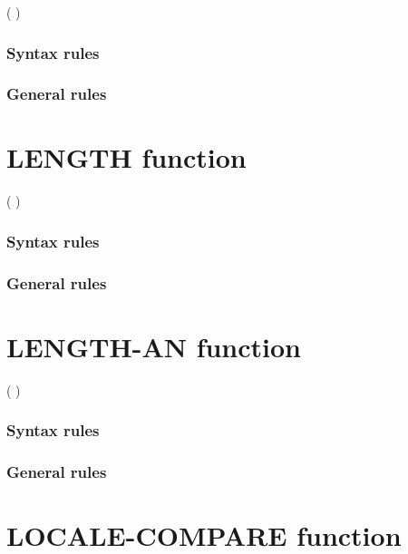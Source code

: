 \begin{syntax}
    ( \argument )
\end{syntax}

\subsubsection{Syntax rules}

\subsubsection{General rules}

\section{LENGTH function}

\begin{syntax}
    ( \argument )
\end{syntax}

\subsubsection{Syntax rules}

\subsubsection{General rules}

\section{LENGTH-AN function}

\begin{syntax}[\miscextcolour]
    ( \argument )
\end{syntax}

\subsubsection{Syntax rules}

\subsubsection{General rules}

\section{LOCALE-COMPARE function}

